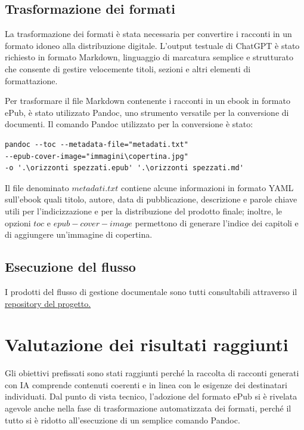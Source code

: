 \documentclass[a4paper,12pt]{article}
\begin{document}
\subsection*{Trasformazione dei formati}
La trasformazione dei formati è stata necessaria per convertire i racconti in un formato idoneo alla distribuzione digitale. L'output testuale di ChatGPT è stato richiesto in formato Markdown, linguaggio di marcatura semplice e strutturato che consente di gestire velocemente titoli, sezioni e altri elementi di formattazione.

\bigbreak

Per trasformare il file Markdown contenente i racconti in un ebook in formato ePub, è stato utilizzato Pandoc, uno strumento versatile per la conversione di documenti. Il comando Pandoc utilizzato per la conversione è stato:

\begin{lstlisting}
pandoc --toc --metadata-file="metadati.txt" 
--epub-cover-image="immagini\copertina.jpg"
-o '.\orizzonti spezzati.epub' '.\orizzonti spezzati.md'
\end{lstlisting}

Il file denominato $metadati.txt$ contiene alcune informazioni in formato YAML sull'ebook quali titolo, autore, data di pubblicazione, descrizione e parole chiave utili per l'indicizzazione e per la distribuzione del prodotto finale; inoltre, le opzioni $toc$ e $epub-cover-image$ permettono di generare l'indice dei capitoli e di aggiungere un'immagine di copertina.


\subsection*{Esecuzione del flusso}
I prodotti del flusso di gestione documentale sono tutti consultabili attraverso il \href{https://github.com/gianlucapironato/editoria_digitale/}{\underline{repository del progetto.}}

\section*{Valutazione dei risultati raggiunti}

Gli obiettivi prefissati sono stati raggiunti perché la raccolta di racconti generati con IA comprende contenuti coerenti e in linea con le esigenze dei destinatari individuati. Dal punto di vista tecnico, l'adozione del formato ePub si è rivelata agevole anche nella fase di trasformazione automatizzata dei formati, perché il tutto si è ridotto all'esecuzione di un semplice comando Pandoc. 
\end{document}
